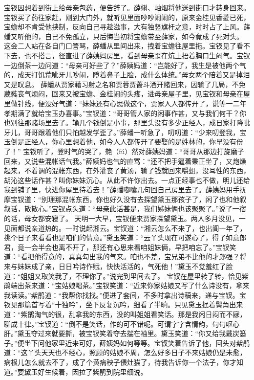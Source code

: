 \documentclass[12pt,oneside]{book}
\begin{document}
宝钗因想着到街上给母亲包药，便告辞了。薛蝌、岫烟将他送到街口才转身回来。宝钗买了药往家赶，刚到大门外，就听见里面吵吵闹闹的，原来金桂见香菱已死，宝蟾却不肯受他挟制，反向自己寻趁滋事，大有独竖旗杆之意，时时占了上风。薛蟠又听他的，自己不免孤立，只后悔当初将宝蟾带至薛家，如今竟成了死对头。
这会二人站在各自门口詈骂，薛蟠从里间出来，拽着宝蟾往屋里拖。宝钗见了看不下去，也不搭言，径直进了薛姨妈房里，看到母亲歪在炕上捂着胸口生闷气。宝钗一边倒茶一边问道：“母亲可好些了？”薛姨妈道：“岂能好了，我生是被他两个气的，成天打饥荒呲牙儿吵闹，瞪着鼻子上脸，成什么体统。”母女两个陪着又是掉泪又是叹息。
薛蟠从贾家藉习射之名和贾蓉贾蔷斗酒开赌回来，因输了几局，不免葳蕤丧气烦闷，回来又被宝蟾、金桂闹的头疼，进母亲屋子里，见宝钗和母亲在屋里做针线，便没好气道：“妹妹还有心思做这个，贾家人人都传开了，说等一二年孝期满了就给宝玉办喜事。”宝钗道：“哥哥管人家的闲事作甚，又与我们何干？你也别往那赌场里去了。输几个钱倒是小事，那里头没有多少正经人，成日家打降呲牙儿，哥哥跟着他们只怕越发学歪了。”薛蟠一听急了，叨叨道：“少来叨登我，宝玉倒是正经人，你心里想着他，如今人人都传开了要娶的是姓林的，你早没有份了！”
宝钗听了，登时气的哭了，艴（fú）然对薛姨妈道：“哥哥从那边打旋磨子回来，又说些混帐话气我。”薛姨妈也气的直骂：“还不把手逼着秉正坐了，又炮燥起来，不着调的混帐东西，在外灌丧了黄汤，输了钱就回来嚼蛆，没耳性的东西，胡沁这些话作甚？叫你妹妹沉心。从此不许你出去。一点正经事也不做，明儿还给我到铺子里，快进你屋里待着去！”薛蟠嘟囔几句回自己房里去了。薛姨妈用手抚摩宝钗道：“别理那混帐东西，你也好久没有去探望黛玉那孩子了，闲了也和他叙叙话，散散心。”宝钗点头道：“母亲此话甚是，我们姊妹俩也该聚聚了。”说了一宿的话，母女都安寝了。
天明一大早，宝钗便来贾家探望黛玉。两人多月没见，一见面都说亲道热的。一时说起湘云。宝钗道：“湘云怎么不来了，也出阁一年了，挑个日子来看看也是咱们的情意。”黛玉笑道：“云丫头现在可遂心了，得了如意郎君，竟一会半会也离不开了，那还有心思来看咱姐妹俩，早把咱忘了。”宝钗笑道：“看把他得意的，真真勾出我的气来。咱也不差，宝兄弟不比他的才郎强？将来与妹妹成了亲，日日吟诗作赋，快快活活的，气死他！”黛玉不觉羞红了脸道：“姐姐又取笑我了，不理你了。”说完到里间去了。
宝钗在屋里转了转，恰见紫鹃端出茶来道：“宝姑娘喝茶。”宝钗笑道：“近来你家姑娘又写了什么诗没有，拿来我读读。”紫鹃道：“我帮你找找。”便进了套间，不多时拿出诗稿来，递与宝钗。宝钗见那篇首写着“十独吟”，坐下反复沉吟，细看了半晌。只见黛玉抿着鬓角出来道：“紫鹃淘气的很，乱拿我的东西，没的叫姐姐看笑话。那是我闲日闷而不寐，聊成十律。”宝钗道：“倒不是笑话，作的可不错呢。可谓字字含情韵，句句呕心肝。”黛玉夺过来就要撕，被宝钗笑着夺去揣在袖里。黛玉笑道：“你又给我戴炭篓子。”便坐下问他家里近来可好，薛姨妈如何等等。宝钗笑着告诉了他，回头对紫鹃道：“这丫头天天也不经心，照顾的姑娘不周，怎么好多日子不来姑娘仍是未愈，病根儿怎么就去不了，成了个黄病秧子偎灶猫了，待我告诉你一个法子，你才知道。”要黛玉好生候着，因拉了紫鹃到院里细说。
\end{document}
